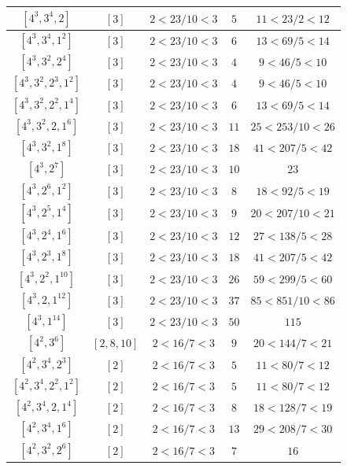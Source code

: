 \documentclass{article}%
\begin{document}
\begin{center}
\begin{longtable}{||c|c|c|c|c||}
$[4^{3}, 3^{4}, 2]$ & $[3]$ & $2 < 23/10 < 3$ & $5$ & $11 < 23/2 < 12$ \\ \hline 
$[4^{3}, 3^{4}, 1^{2}]$ & $[3]$ & $2 < 23/10 < 3$ & $6$ & $13 < 69/5 < 14$ \\ \hline 
$[4^{3}, 3^{2}, 2^{4}]$ & $[3]$ & $2 < 23/10 < 3$ & $4$ & $9 < 46/5 < 10$ \\ \hline 
$[4^{3}, 3^{2}, 2^{3}, 1^{2}]$ & $[3]$ & $2 < 23/10 < 3$ & $4$ & $9 < 46/5 < 10$ \\ \hline 
$[4^{3}, 3^{2}, 2^{2}, 1^{4}]$ & $[3]$ & $2 < 23/10 < 3$ & $6$ & $13 < 69/5 < 14$ \\ \hline 
$[4^{3}, 3^{2}, 2, 1^{6}]$ & $[3]$ & $2 < 23/10 < 3$ & $11$ & $25 < 253/10 < 26$ \\ \hline 
$[4^{3}, 3^{2}, 1^{8}]$ & $[3]$ & $2 < 23/10 < 3$ & $18$ & $41 < 207/5 < 42$ \\ \hline 
$[4^{3}, 2^{7}]$ & $[3]$ & $2 < 23/10 < 3$ & $10$ & $23$ \\ \hline 
$[4^{3}, 2^{6}, 1^{2}]$ & $[3]$ & $2 < 23/10 < 3$ & $8$ & $18 < 92/5 < 19$ \\ \hline 
$[4^{3}, 2^{5}, 1^{4}]$ & $[3]$ & $2 < 23/10 < 3$ & $9$ & $20 < 207/10 < 21$ \\ \hline 
$[4^{3}, 2^{4}, 1^{6}]$ & $[3]$ & $2 < 23/10 < 3$ & $12$ & $27 < 138/5 < 28$ \\ \hline 
$[4^{3}, 2^{3}, 1^{8}]$ & $[3]$ & $2 < 23/10 < 3$ & $18$ & $41 < 207/5 < 42$ \\ \hline 
$[4^{3}, 2^{2}, 1^{10}]$ & $[3]$ & $2 < 23/10 < 3$ & $26$ & $59 < 299/5 < 60$ \\ \hline 
$[4^{3}, 2, 1^{12}]$ & $[3]$ & $2 < 23/10 < 3$ & $37$ & $85 < 851/10 < 86$ \\ \hline 
$[4^{3}, 1^{14}]$ & $[3]$ & $2 < 23/10 < 3$ & $50$ & $115$ \\ \hline 
$[4^{2}, 3^{6}]$ & $[2, 8, 10]$ & $2 < 16/7 < 3$ & $9$ & $20 < 144/7 < 21$ \\ \hline 
$[4^{2}, 3^{4}, 2^{3}]$ & $[2]$ & $2 < 16/7 < 3$ & $5$ & $11 < 80/7 < 12$ \\ \hline 
$[4^{2}, 3^{4}, 2^{2}, 1^{2}]$ & $[2]$ & $2 < 16/7 < 3$ & $5$ & $11 < 80/7 < 12$ \\ \hline 
$[4^{2}, 3^{4}, 2, 1^{4}]$ & $[2]$ & $2 < 16/7 < 3$ & $8$ & $18 < 128/7 < 19$ \\ \hline 
$[4^{2}, 3^{4}, 1^{6}]$ & $[2]$ & $2 < 16/7 < 3$ & $13$ & $29 < 208/7 < 30$ \\ \hline 
$[4^{2}, 3^{2}, 2^{6}]$ & $[2]$ & $2 < 16/7 < 3$ & $7$ & $16$ \\ \hline 

\end{longtable}
\end{center}
\end{document}
